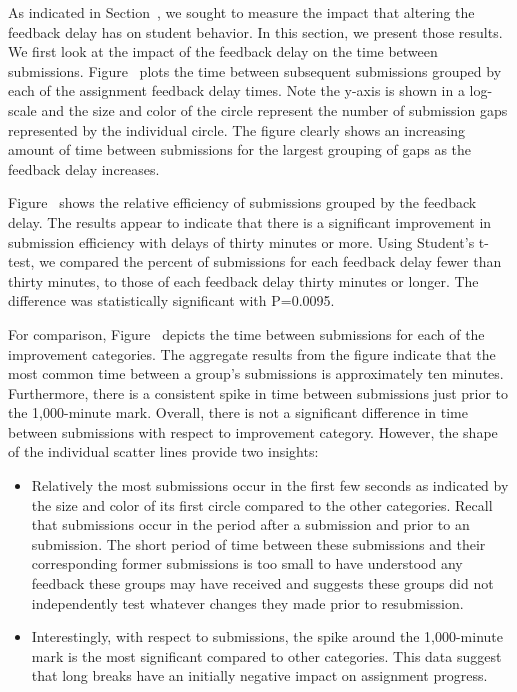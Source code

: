 As indicated in Section~, we sought to measure the impact
that altering the feedback delay has on student behavior. In this section, we
present those results. We first look at the impact of the feedback delay on the
time between submissions. Figure~ plots the time
between subsequent submissions grouped by each of the assignment feedback delay
times. Note the y-axis is shown in a log-scale and the size and color of the
circle represent the number of submission gaps represented by the individual
circle. The figure clearly shows an increasing amount of time between
submissions for the largest grouping of gaps as the feedback delay increases.

Figure~ shows the relative efficiency of
submissions grouped by the feedback delay. The results appear to indicate that
there is a significant improvement in submission efficiency with delays of
thirty minutes or more. Using Student's t-test, we compared the percent of
\imp{} submissions for each feedback delay fewer than thirty minutes, to those
of each feedback delay thirty minutes or longer. The difference was
statistically significant with P=0.0095.

For comparison, Figure~ depicts the time between
submissions for each of the improvement categories. The aggregate results from
the figure indicate that the most common time between a group's submissions is
approximately ten minutes. Furthermore, there is a consistent spike in time
between submissions just prior to the 1,000-minute mark. Overall, there is not
a significant difference in time between submissions with respect to
improvement category. However, the shape of the individual scatter lines
provide two insights:

\begin{itemize}
\item Relatively the most \noii{} submissions occur in the first few seconds as
  indicated by the size and color of its first circle compared to the other
  categories. Recall that \noii{} submissions occur in the period after a
  \worse{} submission and prior to an \imp{} submission. The short period of
  time between these submissions and their corresponding former submissions is
  too small to have understood any feedback these groups may have received and
  suggests these groups did not independently test whatever changes they made
  prior to resubmission.
\item Interestingly, with respect to \worse{} submissions, the spike around the
  1,000-minute mark is the most significant compared to other categories. This
  data suggest that long breaks have an initially negative impact on assignment
  progress.
\end{itemize}

